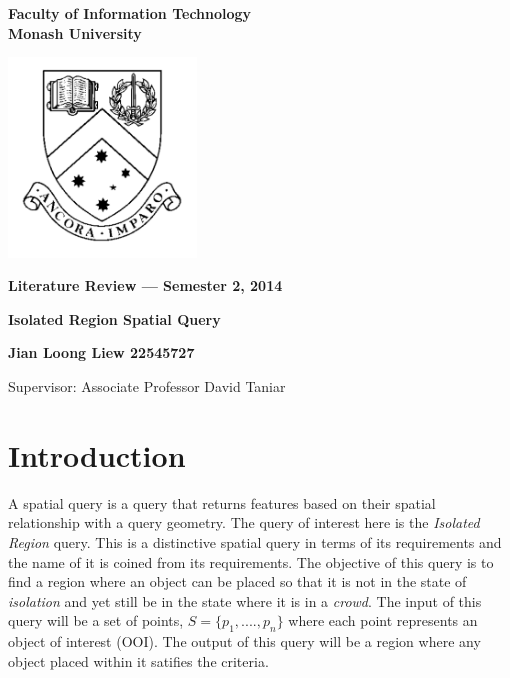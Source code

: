 \documentclass[a4paper,11pt]{article}
\begin{document}
\thispagestyle{empty} %
\renewcommand{\thepage}{\roman{page}}

\begin{spacing}{1.5}
\begin{center}
{\Large \bfseries
Faculty of Information Technology\\
Monash University}

\vspace*{30mm}

\includegraphics[width=5cm]{MonashCrest}

\vspace*{15mm}

{\large \bfseries
Literature Review --- Semester 2, 2014
}

\vspace*{10mm}

{\LARGE \bfseries
Isolated Region Spatial Query
}

\vspace*{20mm}

{\large \bfseries
Jian Loong Liew 22545727

\vspace*{20mm}

Supervisor: Associate Professor David Taniar
}

\end{center}
\end{spacing}

\newpage

\tableofcontents

\newpage
\setcounter{page}{1}
\renewcommand{\thepage}{\arabic{page}}

\section{Introduction} 

A spatial query is a query that returns features based on their spatial relationship with a query geometry. The query of interest here is the \textit{Isolated Region} query. This is a distinctive spatial query in terms of its requirements and the name of it is coined from its requirements. The objective of this query is to find a region where an object can be placed so that it is not in the state of \textit{isolation} and yet still be in the state where it is in a \textit{crowd}. The input of this query will be a set of points, $S = \{p_1,....,p_n\}$ where each point represents an object of interest (OOI). The output of this query will be a region where any object placed within it satifies the criteria.
\end{document}
